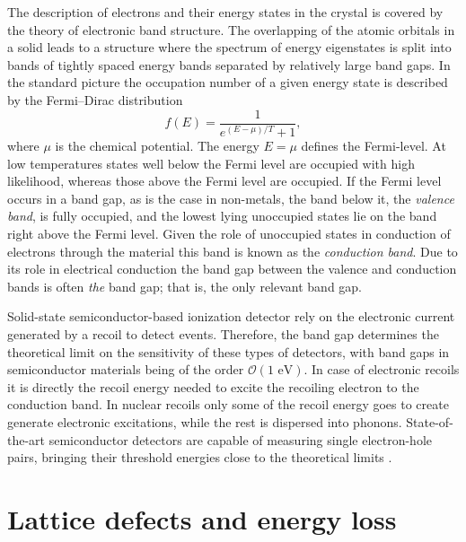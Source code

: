\documentclass[b5paper, 10pt, twoside]{book}
\begin{document}
The description of electrons and their energy states in the crystal is covered by the theory of electronic band structure. The overlapping of the atomic orbitals in a solid leads to a structure where the spectrum of energy eigenstates is split into bands of tightly spaced energy bands separated by relatively large band gaps. In the standard picture the occupation number of a given energy state is described by the Fermi--Dirac distribution
\begin{equation}
f(E)=\frac{1}{e^{(E-\mu)/T}+1},
\end{equation}
where $\mu$ is the chemical potential. The energy $E=\mu$ defines the Fermi-level. At low temperatures states well below the Fermi level are occupied with high likelihood, whereas those above the Fermi level are occupied. If the Fermi level occurs in a band gap, as is the case in non-metals, the band below it, the \emph{valence band}, is fully occupied, and the lowest lying unoccupied states lie on the band right above the Fermi level. Given the role of unoccupied states in conduction of electrons through the material this band is known as the \emph{conduction band}. Due to its role in electrical conduction the band gap between the valence and conduction bands is often \emph{the} band gap; that is, the only relevant band gap.

Solid-state semiconductor-based ionization detector rely on the electronic current generated by a recoil to detect events. Therefore, the band gap determines the theoretical limit on the sensitivity of these types of detectors, with band gaps in semiconductor materials being of the order $\mathcal{O}(1\text{ eV})$. In case of electronic recoils it is directly the recoil energy needed to excite the recoiling electron to the conduction band. In nuclear recoils only some of the recoil energy goes to create generate electronic excitations, while the rest is dispersed into phonons. State-of-the-art semiconductor detectors are capable of measuring single electron-hole pairs, bringing their threshold energies close to the theoretical limits \parencites{RomaniEtAl2018, CrislerEtAl2018, EDELWEISS2020}.

\section{Lattice defects and energy loss}
\end{document}
